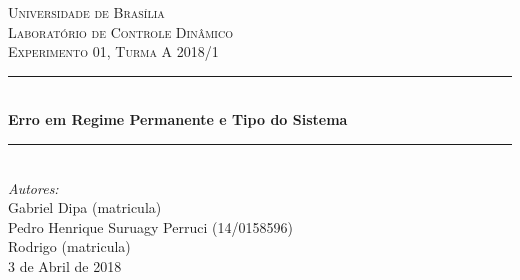 \begin{titlepage}

\newcommand{\HRule}{\rule{\linewidth}{0.5mm}} %

\center %
 

\textsc{\LARGE Universidade de Brasília}\\[1.5cm] %
\textsc{\Large Laboratório de Controle Dinâmico}\\[0.5cm] %
\textsc{\large Experimento 01, Turma A 2018/1}\\[0.5cm] %


\HRule \\[0.4cm]
{ \huge \bfseries Erro em Regime Permanente e Tipo do Sistema}\\[0.4cm] %
\HRule \\[1.0cm]
 

\Large \emph{Autores:}\\
Gabriel Dipa (matricula) \\
Pedro Henrique Suruagy Perruci (14/0158596)\\
Rodrigo (matricula)\\[0.5cm]

{\large 3 de Abril de 2018}\\[1cm] %



\end{titlepage}
